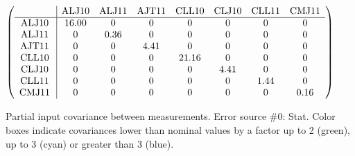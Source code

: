 \begin{table}[H]
\scriptsize
\begin{center}
\renewcommand{\arraystretch}{1.1}
\begin{math}\left(\begin{array}{c|ccccccc}
 & \mathrm{ALJ10} & 
\mathrm{ALJ11} & 
\mathrm{AJT11} & 
\mathrm{CLL10} & 
\mathrm{CLJ10} & 
\mathrm{CLL11} & 
\mathrm{CMJ11} \\
\hline
\mathrm{ALJ10} \hspace*{2pt} &      16.00 &  0 &  0 &  0 &  0 &  0 &  0 \\
\mathrm{ALJ11} \hspace*{2pt} &  0 &       0.36 &  0 &  0 &  0 &  0 &  0 \\
\mathrm{AJT11} \hspace*{2pt} &  0 &  0 &       4.41 &  0 &  0 &  0 &  0 \\
\mathrm{CLL10} \hspace*{2pt} &  0 &  0 &  0 &      21.16 &  0 &  0 &  0 \\
\mathrm{CLJ10} \hspace*{2pt} &  0 &  0 &  0 &  0 &       4.41 &  0 &  0 \\
\mathrm{CLL11} \hspace*{2pt} &  0 &  0 &  0 &  0 &  0 &       1.44 &  0 \\
\mathrm{CMJ11} \hspace*{2pt} &  0 &  0 &  0 &  0 &  0 &  0 &       0.16 \\
\end{array}\right)\end{math}
\caption{Partial input covariance between measurements. Error source \#0: Stat. Color boxes indicate covariances lower than nominal values by a factor up to 2 (green), up to 3 (cyan) or greater than 3 (blue).}
\renewcommand{\arraystretch}{1}
\end{center}
\end{table}
